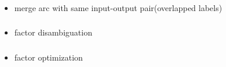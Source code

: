 \documentclass{beamer}
\begin{document}
\frame
{
  \frametitle{\subsecname}
  
  \begin{itemize}
  \item{merge arc with same input-output pair(overlapped labels)}
  \end{itemize}
  
}

\frame
{
  \frametitle{\subsecname}
  
  \begin{itemize}
  \item{factor disambiguation}
  \end{itemize}
  
}

\frame
{
  \frametitle{\subsecname}
  
  \begin{itemize}
  \item{factor optimization}
  \end{itemize}
  
}
\end{document}
